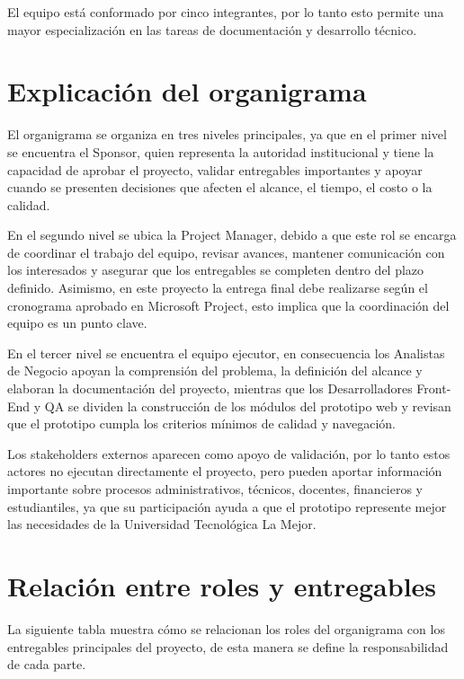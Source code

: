\documentclass[11pt,spanish]{article}
\begin{document}
El equipo está conformado por cinco integrantes, por lo tanto esto permite una mayor especialización en las tareas de documentación y desarrollo técnico.

\section{Explicación del organigrama}

El organigrama se organiza en tres niveles principales, ya que en el primer nivel se encuentra el Sponsor, quien representa la autoridad institucional y tiene la capacidad de aprobar el proyecto, validar entregables importantes y apoyar cuando se presenten decisiones que afecten el alcance, el tiempo, el costo o la calidad.

En el segundo nivel se ubica la Project Manager, debido a que este rol se encarga de coordinar el trabajo del equipo, revisar avances, mantener comunicación con los interesados y asegurar que los entregables se completen dentro del plazo definido. Asimismo, en este proyecto la entrega final debe realizarse según el cronograma aprobado en Microsoft Project, esto implica que la coordinación del equipo es un punto clave.

En el tercer nivel se encuentra el equipo ejecutor, en consecuencia los Analistas de Negocio apoyan la comprensión del problema, la definición del alcance y elaboran la documentación del proyecto, mientras que los Desarrolladores Front-End y QA se dividen la construcción de los módulos del prototipo web y revisan que el prototipo cumpla los criterios mínimos de calidad y navegación.

Los stakeholders externos aparecen como apoyo de validación, por lo tanto estos actores no ejecutan directamente el proyecto, pero pueden aportar información importante sobre procesos administrativos, técnicos, docentes, financieros y estudiantiles, ya que su participación ayuda a que el prototipo represente mejor las necesidades de la Universidad Tecnológica La Mejor.

\section{Relación entre roles y entregables}

La siguiente tabla muestra cómo se relacionan los roles del organigrama con los entregables principales del proyecto, de esta manera se define la responsabilidad de cada parte.
\end{document}
